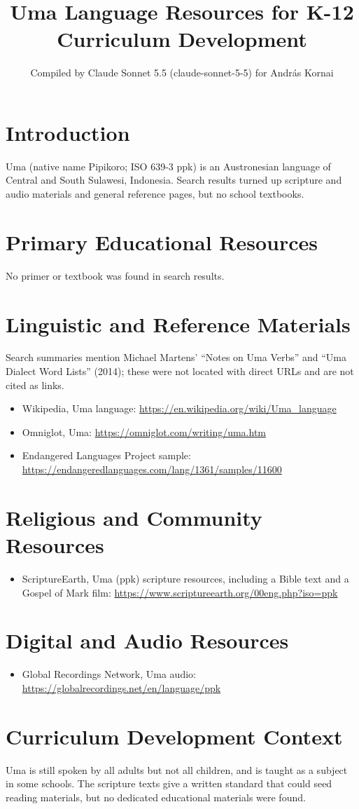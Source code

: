 \documentclass[12pt]{article}
\title{Uma Language Resources for K-12 Curriculum Development}
\author{Compiled by Claude Sonnet 5.5 (claude-sonnet-5-5) for Andr\'as Kornai}
\date{}
\begin{document}
\maketitle

\section{Introduction}
Uma (native name Pipikoro; ISO 639-3 ppk) is an Austronesian language of Central and South Sulawesi, Indonesia. Search results turned up scripture and audio materials and general reference pages, but no school textbooks.

\section{Primary Educational Resources}
No primer or textbook was found in search results.

\section{Linguistic and Reference Materials}
Search summaries mention Michael Martens' ``Notes on Uma Verbs'' and ``Uma Dialect Word Lists'' (2014); these were not located with direct URLs and are not cited as links.
\begin{itemize}
\item Wikipedia, Uma language: \url{https://en.wikipedia.org/wiki/Uma_language}
\item Omniglot, Uma: \url{https://omniglot.com/writing/uma.htm}
\item Endangered Languages Project sample: \url{https://endangeredlanguages.com/lang/1361/samples/11600}
\end{itemize}

\section{Religious and Community Resources}
\begin{itemize}
\item ScriptureEarth, Uma (ppk) scripture resources, including a Bible text and a Gospel of Mark film: \url{https://www.scriptureearth.org/00eng.php?iso=ppk}
\end{itemize}

\section{Digital and Audio Resources}
\begin{itemize}
\item Global Recordings Network, Uma audio: \url{https://globalrecordings.net/en/language/ppk}
\end{itemize}

\section{Curriculum Development Context}
Uma is still spoken by all adults but not all children, and is taught as a subject in some schools. The scripture texts give a written standard that could seed reading materials, but no dedicated educational materials were found.
\end{document}
